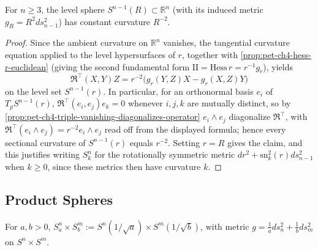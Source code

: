 \begin{proposition}
  \label{prop:pet-ch4-euclidean-sphere-constant-curvature}
  For $n\ge3$, the level sphere $S^{n-1}(R)\subset\mathbb{R}^n$ (with its induced metric
  $g_R=R^2ds_{n-1}^2$) has constant curvature $R^{-2}$.
\end{proposition}
\begin{proof}
  Since the ambient curvature on $\mathbb{R}^n$ vanishes, the tangential curvature
  equation applied to the level hypersurfaces of $r$, together with
  \cref{prop:pet-ch4-hess-r-euclidean} (giving the second fundamental form
  $\mathrm{II}=\mathrm{Hess}\,r=r^{-1}g_r$), yields
  \[
    \mathfrak{R}^\top(X,Y)Z=r^{-2}\big(g_r(Y,Z)X-g_r(X,Z)Y\big)
  \]
  on the level set $S^{n-1}(r)$. In particular, for an orthonormal basis $e_i$ of
  $T_pS^{n-1}(r)$, $\mathfrak{R}^\top(e_i,e_j)e_k=0$ whenever $i,j,k$ are mutually
  distinct, so by \cref{prop:pet-ch4-triple-vanishing-diagonalizes-operator}
  $e_i\wedge e_j$ diagonalize $\mathfrak{R}^\top$, with
  $\mathfrak{R}^\top(e_i\wedge e_j)=r^{-2}e_i\wedge e_j$ read off from the displayed
  formula; hence every sectional curvature of $S^{n-1}(r)$ equals $r^{-2}$. Setting
  $r=R$ gives the claim, and this justifies writing $S^n_k$ for the rotationally
  symmetric metric $dr^2+\mathrm{sn}_k^2(r)ds_{n-1}^2$ when $k\ge0$, since these
  metrics then have curvature $k$.
\end{proof}

\subsection{Product Spheres}

\begin{definition}
  \label{def:pet-ch4-product-sphere-metric}
  \leanok
  For $a,b>0$, $S^n_a\times S^m_b:=S^n(1/\sqrt a)\times S^m(1/\sqrt b)$, with metric
  $g=\tfrac1a ds_n^2+\tfrac1b ds_m^2$ on $S^n\times S^m$.
\end{definition}

